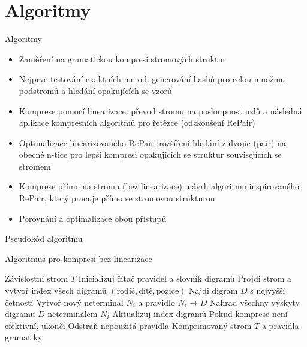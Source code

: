 \documentclass[lualatex,hyperref={pdfencoding=auto}]{beamer}
\begin{document}
\section{Algoritmy}
\begin{frame}{Algoritmy}
  \begin{itemize}
    \item Zaměření na gramatickou kompresi stromových struktur
    \item Nejprve testování exaktních metod: generování hashů pro celou množinu podstromů a hledání opakujících se vzorů
    \item Komprese pomocí linearizace: převod stromu na posloupnost uzlů a následná aplikace kompresních algoritmů pro řetězce (odzkoušení RePair) \nocite{McAnlis2016}
    \item Optimalizace linearizovaného RePair: rozšíření hledání z dvojic (pair) na obecné n-tice pro lepší kompresi opakujících se struktur souvisejících se stromem
    \item Komprese přímo na stromu (bez linearizace): návrh algoritmu inspirovaného RePair, který pracuje přímo se stromovou strukturou
    \item Porovnání a optimalizace obou přístupů
  \end{itemize}
\end{frame}

\begin{frame}{Pseudokód algoritmu}
\begin{algorithm}[H]
\caption{Algoritmus pro kompresi bez linearizace} 
\begin{algorithmic}[1] 
  \REQUIRE Závislostní strom $T$ 
  \STATE Inicializuj čítač pravidel a slovník digramů 
  \STATE Projdi strom a vytvoř index všech digramů $(\text{rodič}, \text{dítě}, \text{pozice})$ 
  \STATE Najdi digram $D$ s nejvyšší četností 
  \STATE Vytvoř nový neterminál $N_i$ a pravidlo $N_i 
  \rightarrow D$ 
  \STATE Nahraď všechny výskyty digramu $D$ neterminálem $N_i$ 
  \STATE Aktualizuj index digramů 
  \STATE Pokud komprese není efektivní, ukonči 
  \ENDWHILE 
  \STATE Odstraň nepoužitá pravidla 
  \RETURN Komprimovaný strom $T$ a pravidla gramatiky 
\end{algorithmic} 
\end{algorithm}

\end{frame}
\end{document}
